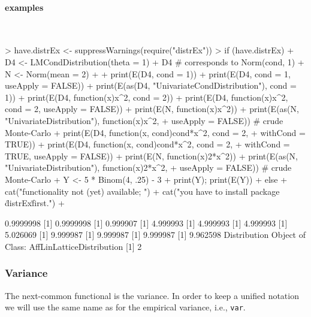 \documentclass[11pt]{article}
\newcommand{\code}[1]{{\tt #1}}
\begin{document}
\paragraph{examples} $ \mbox{ }$\newline
\begin{Schunk}
\begin{Sinput}
> have.distrEx <- suppressWarnings(require("distrEx"))
> if (have.distrEx) 
+     {D4 <- LMCondDistribution(theta = 1)
+      D4  # corresponds to Norm(cond, 1)
+      N <- Norm(mean = 2)
+ 
+      print(E(D4, cond = 1))
+      print(E(D4, cond = 1, useApply = FALSE))
+      print(E(as(D4, "UnivariateCondDistribution"), cond = 1))
+      print(E(D4, function(x){x^2}, cond = 2))
+      print(E(D4, function(x){x^2}, cond = 2, useApply = FALSE))
+      print(E(N, function(x){x^2}))
+      print(E(as(N, "UnivariateDistribution"), function(x){x^2},
+        useApply = FALSE)) # crude Monte-Carlo
+      print(E(D4, function(x, cond){cond*x^2}, cond = 2,
+        withCond = TRUE))
+      print(E(D4, function(x, cond){cond*x^2}, cond = 2,
+        withCond = TRUE, useApply = FALSE))
+      print(E(N, function(x){2*x^2}))
+      print(E(as(N, "UnivariateDistribution"), function(x){2*x^2},
+        useApply = FALSE)) # crude Monte-Carlo
+      Y <- 5 * Binom(4, .25) - 3
+      print(Y); print(E(Y))  
+     } else {
+     cat("\n functionality not (yet) available; ")
+     cat("you have to install package \"distrEx\" first.\n")
+     }
\end{Sinput}
\begin{Soutput}
[1] 0.9999998
[1] 0.9999998
[1] 0.999907
[1] 4.999993
[1] 4.999993
[1] 4.999993
[1] 5.026069
[1] 9.999987
[1] 9.999987
[1] 9.999987
[1] 9.962598
Distribution Object of Class: AffLinLatticeDistribution
[1] 2
\end{Soutput}
\end{Schunk}
%
%
\subsubsection{Variance}
The next-common functional is the variance. In order to keep a unified
notation we will use the same name as for the empirical variance, i.e.,
 \code{var}.
\end{document}
